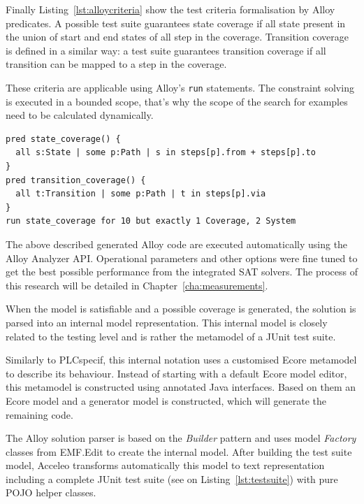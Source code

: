 Finally Listing~\ref{lst:alloycriteria} show the test criteria formalisation by Alloy predicates. A possible test suite guarantees state coverage if all state present in the union of start and end states of all step in the coverage. Transition coverage is defined in a similar way: a test suite guarantees transition coverage if all transition can be mapped to a step in the coverage.

These criteria are applicable using Alloy's \texttt{run} statements. The constraint solving is executed in a bounded scope, that's why the scope of the search for examples need to be calculated dynamically.

\begin{lstlisting}[label={lst:alloycriteria}, caption=Formalising criteria with Alloy,breaklines=true]
pred state_coverage() {
  all s:State | some p:Path | s in steps[p].from + steps[p].to
}
pred transition_coverage() {
  all t:Transition | some p:Path | t in steps[p].via
}
run state_coverage for 10 but exactly 1 Coverage, 2 System
\end{lstlisting}

The above described generated Alloy code are executed automatically using the Alloy Analyzer API. Operational parameters and other options were fine tuned to get the best possible performance from the integrated SAT solvers. The process of this research will be detailed in Chapter~\ref{cha:measurements}.

When the model is satisfiable and a possible coverage is generated, the solution is parsed into an internal model representation. This internal model is closely related to the testing level and is rather the metamodel of a JUnit test suite.

Similarly to PLCspecif, this internal notation uses a customised Ecore metamodel to describe its behaviour. Instead of starting with a default Ecore model editor, this metamodel is constructed using annotated Java interfaces. Based on them an Ecore model and a generator model is constructed, which will generate the remaining code.

The Alloy solution parser is based on the \textit{Builder} pattern and uses model \textit{Factory} classes from EMF.Edit to create the internal model. After building the test suite model, Acceleo transforms automatically this model to text representation including a complete JUnit test suite (see on Listing~\ref{lst:testsuite}) with pure POJO helper classes.

